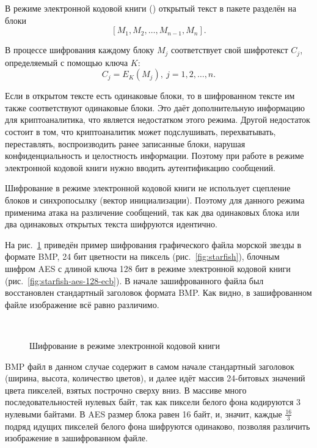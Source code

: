 В режиме электронной кодовой книги () открытый текст в пакете разделён на блоки
    \[ \left[ M_1, M_2, \dots, M_{n-1}, M_n \right]. \]

В процессе шифрования каждому блоку $M_j$ соответствует свой шифротекст $C_j$, определяемый с помощью ключа $K$:
    \[ C_j = E_K(M_j), ~ j = 1, 2, \dots, n. \]

Если в открытом тексте есть одинаковые блоки, то в шифрованном тексте им также соответствуют одинаковые блоки. Это даёт дополнительную информацию для криптоаналитика, что является недостатком этого режима. Другой недостаток состоит в том, что криптоаналитик может подслушивать, перехватывать, переставлять, воспроизводить ранее записанные блоки, нарушая конфиденциальность и целостность информации. Поэтому при работе в режиме электронной кодовой книги нужно вводить аутентификацию сообщений.

Шифрование в режиме электронной кодовой книги не использует сцепление блоков и синхропосылку (вектор инициализации). Поэтому для данного режима применима атака на различение сообщений, так как два одинаковых блока или два одинаковых открытых текста шифруются идентично.

На рис.~\ref{fig:ecb-demo} приведён пример шифрования графического файла морской звезды в формате BMP, 24 бит цветности на пиксель (рис.~\ref{fig:starfish}), блочным шифром AES с длиной ключа 128 бит в режиме электронной кодовой книги (рис.~\ref{fig:starfish-aes-128-ecb}). В начале зашифрованного файла был восстановлен стандартный заголовок формата BMP. Как видно, в зашифрованном файле изображение всё равно различимо.
\begin{figure}[!ht]
    \centering
    ~~~
    \caption{Шифрование в режиме электронной кодовой книги\label{fig:ecb-demo}}
\end{figure}
BMP файл в данном случае содержит в самом начале стандартный заголовок (ширина, высота, количество цветов), и далее идёт массив 24-битовых значений цвета пикселей, взятых построчно сверху вниз. В массиве много последовательностей нулевых байт, так как пиксели белого фона кодируются 3 нулевыми байтами. В AES размер блока равен 16 байт, и, значит, каждые $\frac{16}{3}$ подряд идущих пикселей белого фона шифруются одинаково, позволяя различить изображение в зашифрованном файле.

